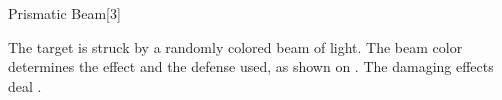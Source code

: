 \begin{spellsection}{Prismatic Beam}[3]
    \begin{spellheader}
    \end{spellheader}
    \begin{spellcontent}
        \begin{spelltargetinginfo}
        \end{spelltargetinginfo}
        \begin{spelleffects}
            \spellspecial The target is struck by a randomly colored beam of light. The beam color determines the effect and the defense used, as shown on . The damaging effects deal \spelldamage{}.
        \end{spelleffects}
    \end{spellcontent}
    \begin{spellfooter}
        \miscastrandom
    \end{spellfooter}
    \begin{spellaugments}
    \end{spellaugments}
\end{spellsection}
